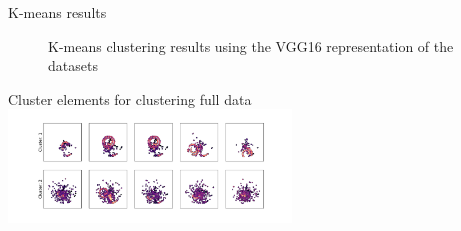 \documentclass{beamer}
\begin{document}
\begin{frame}[t]{K-means results}
	\begin{figure}[h]
		\centering 
		\caption{K-means clustering results using the VGG16 representation of the datasets}
	\end{figure}
	Cluster elements for clustering full data 
	\centering 
	\includegraphics[height=3cm]{../chapters/results/clustering/plots/full_vgg_cluster_repr.pdf}
\end{frame}
\end{document}
